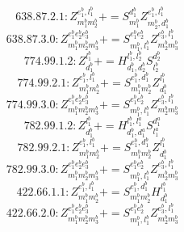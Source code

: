 \documentclass[letterpaper,10pt,fleqn,leqno,onecolumn]{article}
\begin{document}
\begin{equation} \;\;\;\;\;\;  638.87.2.1: Z^{e_{1}^{b},l_{1}^{b}}_{m_{1}^{b}m_{2}^{b}}+=S^{d_{1}^{b}}_{m_{1}^{b}}Z^{e_{1}^{b},l_{1}^{b}}_{m_{2}^{b},d_{1}^{b}} \end{equation}
\begin{equation} \;\;\;\;\;\;  638.87.3.0: Z^{e_{1}^{b}e_{2}^{b}e_{3}^{b}}_{m_{1}^{b}m_{2}^{b}m_{3}^{b}}+=S^{e_{1}^{b}e_{2}^{b}}_{m_{1}^{b},l_{1}^{b}}Z^{e_{3}^{b},l_{1}^{b}}_{m_{2}^{b}m_{3}^{b}} \end{equation}
\begin{equation} \;\;\;\;\;\;  774.99.1.2: Z^{l_{1}^{b}}_{d_{1}^{b}}+=H^{l_{1}^{b},l_{2}^{b}}_{d_{1}^{b},d_{2}^{b}}S^{d_{2}^{b}}_{l_{2}^{b}} \end{equation}
\begin{equation} \;\;\;\;\;\;  774.99.2.1: Z^{e_{1}^{b},l_{1}^{b}}_{m_{1}^{b}m_{2}^{b}}+=S^{e_{1}^{b},d_{1}^{b}}_{m_{1}^{b}m_{2}^{b}}Z^{l_{1}^{b}}_{d_{1}^{b}} \end{equation}
\begin{equation} \;\;\;\;\;\;  774.99.3.0: Z^{e_{1}^{b}e_{2}^{b}e_{3}^{b}}_{m_{1}^{b}m_{2}^{b}m_{3}^{b}}+=S^{e_{1}^{b}e_{2}^{b}}_{m_{1}^{b},l_{1}^{b}}Z^{e_{3}^{b},l_{1}^{b}}_{m_{2}^{b}m_{3}^{b}} \end{equation}
\begin{equation} \;\;\;\;\;\;  782.99.1.2: Z^{l_{1}^{b}}_{d_{1}^{b}}+=H^{l_{1}^{b},l_{1}^{a}}_{d_{1}^{b},d_{1}^{a}}S^{d_{1}^{a}}_{l_{1}^{a}} \end{equation}
\begin{equation} \;\;\;\;\;\;  782.99.2.1: Z^{e_{1}^{b},l_{1}^{b}}_{m_{1}^{b}m_{2}^{b}}+=S^{e_{1}^{b},d_{1}^{b}}_{m_{1}^{b}m_{2}^{b}}Z^{l_{1}^{b}}_{d_{1}^{b}} \end{equation}
\begin{equation} \;\;\;\;\;\;  782.99.3.0: Z^{e_{1}^{b}e_{2}^{b}e_{3}^{b}}_{m_{1}^{b}m_{2}^{b}m_{3}^{b}}+=S^{e_{1}^{b}e_{2}^{b}}_{m_{1}^{b},l_{1}^{b}}Z^{e_{3}^{b},l_{1}^{b}}_{m_{2}^{b}m_{3}^{b}} \end{equation}
\begin{equation} \;\;\;\;\;\;  422.66.1.1: Z^{e_{1}^{b},l_{1}^{b}}_{m_{1}^{b}m_{2}^{b}}+=S^{e_{1}^{b},d_{1}^{b}}_{m_{1}^{b}m_{2}^{b}}H^{l_{1}^{b}}_{d_{1}^{b}} \end{equation}
\begin{equation} \;\;\;\;\;\;  422.66.2.0: Z^{e_{1}^{b}e_{2}^{b}e_{3}^{b}}_{m_{1}^{b}m_{2}^{b}m_{3}^{b}}+=S^{e_{1}^{b}e_{2}^{b}}_{m_{1}^{b},l_{1}^{b}}Z^{e_{3}^{b},l_{1}^{b}}_{m_{2}^{b}m_{3}^{b}} \end{equation}
\end{document}
